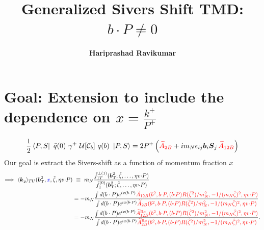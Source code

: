 \documentclass[]{article}
\title{Generalized Sivers Shift TMD: $b\cdot P \neq 0$}
\author{\textbf{Hariprashad Ravikumar}}
\date{}
\numberwithin{equation}{section}
\newcommand{\tcdot}{{\cdot}}
\newcommand{\WlineC}[1]{\ensuremath{{\mathcal{U}}{[#1]}}}
\newcommand{\vect}[1]{\ensuremath{\boldsymbol{#1}}}
\newcommand{\vprp}[1]{\vect{#1}_{\mathrm T}}
\newcommand{\tAmp}{\widetilde{A}}
\newcommand{\tAmp}{\ensuremath{\widetilde{A}^{(+)}}}
\newcommand{\bvec}{b}
\newcommand{\mN}{m_N}
\newcommand{\zetahat}{{\hat \zeta}}
\begin{document}
	\maketitle
\tableofcontents
\section{Goal: Extension to include the dependence on $x=\frac{k^{+}}{P^{+}}$}
\begin{align}
    \frac{1}{2} \bra{P,S}\ \bar{q}(0)\ \gamma^{+}\ \WlineC{\mathcal{C}_\bvec}\ q(\bvec)\ \ket{P,S}=2P^{+}\left(\textcolor{red}{\tAmp_{2B} }
		+ i \mN \epsilon_{ij} \vect{\bvec}_i \vect{S}_j\, \textcolor{red}{\tAmp_{12B} }\right)
\end{align}
Our goal is extract the Sivers-shift as a function of momentum fraction $x$
\begin{align}
   \Longrightarrow~ \langle \vect{k}_y \rangle_{TU}(\vprp{\bvec}^2,\textcolor{blue}{x},\zetahat,\eta v \tcdot P) 
	&\ \equiv\ \mN \frac{\tilde f_{1T}^{\perp(1)}(\vprp{\bvec}^2;\zetahat,\ldots,\eta v \tcdot P)}{\tilde f_1^{(0)}(\vprp{\bvec}^2;\zetahat,\ldots,\eta v \tcdot P)}\\
 &=-m_{N} \frac{\int d(b\cdot P)e^{ix(b\cdot P)} \textcolor{red}{\tAmp_{12B}(\bvec^2,\bvec \tcdot P,(\bvec \tcdot P) R(\zetahat^2)/\mN^2,-1/(\mN\zetahat)^2,\eta v \tcdot P)}}{\int d(b\cdot P)e^{ix(b\cdot P)}\textcolor{red}{\tAmp_{2B}(\bvec^2,\bvec \tcdot P,(\bvec \tcdot P) R(\zetahat^2)/\mN^2,-1/(\mN\zetahat)^2,\eta v \tcdot P)}}\\
 &=-m_{N} \frac{\int d(b\cdot P)e^{ix(b\cdot P)} \textcolor{red}{\tAmp_{12B}^{\text{Re}}(\bvec^2,\bvec \tcdot P,(\bvec \tcdot P) R(\zetahat^2)/\mN^2,-1/(\mN\zetahat)^2,\eta v \tcdot P)}}{\int d(b\cdot P)e^{ix(b\cdot P)}\textcolor{red}{\tAmp_{2B}^{\text{Re}}(\bvec^2,\bvec \tcdot P,(\bvec \tcdot P) R(\zetahat^2)/\mN^2,-1/(\mN\zetahat)^2,\eta v \tcdot P)}}.
 \end{align}
\end{document}
